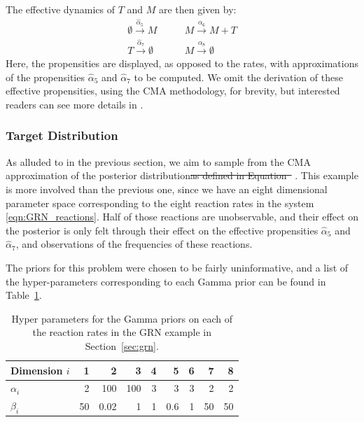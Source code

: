 \documentclass[final]{siamltex}
\providecommand{\DIFdel}[1]{{\protect\color{red}\sout{#1}}}                      %
\providecommand{\DIFdelbegin}{} %
\providecommand{\DIFdelend}{} %
\providecommand{\DIFaddbeginFL}{} %
\providecommand{\DIFaddendFL}{} %
\providecommand{\DIFdelbeginFL}{} %
\providecommand{\DIFdelendFL}{} %
\newcommand{\DIFscaledelfig}{0.5}
\newlength{\DIFdelgraphicswidth} %
\newlength{\DIFdelgraphicsheight} %
\newcommand{\DIFaddincludegraphics}[2][]{{\color{blue}\fbox{\DIFOincludegraphics[#1]{#2}}}} %
\newcommand{\DIFdelincludegraphics}[2][]{%
\sbox{\DIFdelgraphicsbox}{\DIFOincludegraphics[#1]{#2}}%
\settoboxwidth{\DIFdelgraphicswidth}{\DIFdelgraphicsbox} %
\settoboxtotalheight{\DIFdelgraphicsheight}{\DIFdelgraphicsbox} %
\scalebox{\DIFscaledelfig}{%
\parbox[b]{\DIFdelgraphicswidth}{\usebox{\DIFdelgraphicsbox}\\[-\baselineskip] \rule{\DIFdelgraphicswidth}{0em}}\llap{\resizebox{\DIFdelgraphicswidth}{\DIFdelgraphicsheight}{%
\setlength{\unitlength}{\DIFdelgraphicswidth}%
\begin{picture}(1,1)%
\thicklines\linethickness{2pt} %
{\color[rgb]{1,0,0}\put(0,0){\framebox(1,1){}}}%
{\color[rgb]{1,0,0}\put(0,0){\line( 1,1){1}}}%
{\color[rgb]{1,0,0}\put(0,1){\line(1,-1){1}}}%
\end{picture}%
}\hspace*{3pt}}} %
} %
\DeclareRobustCommand{\DIFdelbegin}{\DIFOdelbegin \let\includegraphics\DIFdelincludegraphics} %
\DeclareRobustCommand{\DIFdelend}{\DIFOaddend \let\includegraphics\DIFOincludegraphics} %
\DeclareRobustCommand{\DIFaddbeginFL}{\DIFOaddbeginFL \let\includegraphics\DIFaddincludegraphics} %
\DeclareRobustCommand{\DIFaddendFL}{\DIFOaddendFL \let\includegraphics\DIFOincludegraphics} %
\DeclareRobustCommand{\DIFdelbeginFL}{\DIFOdelbeginFL \let\includegraphics\DIFdelincludegraphics} %
\DeclareRobustCommand{\DIFdelendFL}{\DIFOaddendFL \let\includegraphics\DIFOincludegraphics} %
\begin{document}
The effective dynamics of $T$ and $M$ are then given by:
\begin{align}
	\emptyset \xrightarrow{\hat{\alpha}_5} M \quad & \quad M\xrightarrow{\alpha_6} M+T  \label{eqn:GRN_eff} \\
	T \xrightarrow{\hat{\alpha}_7} \emptyset \quad & \quad M \xrightarrow{\alpha_8} \emptyset \nonumber
\end{align}
Here, the propensities are displayed, as opposed to the rates, with
approximations of the propensities $\hat{\alpha}_5$ and
$\hat{\alpha}_7$ to be computed. We omit the derivation of these
effective propensities, using the CMA methodology, for brevity, but
interested readers can see more details in \cite{russ2017parallel}.

\subsubsection{Target Distribution}
As alluded to in the previous section, we aim to sample from the CMA
approximation of the posterior distribution\DIFdelbegin \DIFdel{as defined in
Equation~}%
\DIFdelend . This example is more involved
than the previous one, since we have an eight dimensional parameter
space corresponding to the eight reaction rates in the system
\eqref{eqn:GRN_reactions}. Half of those reactions are
unobservable, and their effect on the posterior is only felt through
their effect on the effective propensities $\hat{\alpha}_5$ and
$\hat{\alpha}_7$, and observations of the frequencies of these reactions.

The priors for this problem were chosen to be fairly uninformative,
and a list of the hyper-parameters corresponding to each Gamma prior can be found in Table~\ref{tab:grn_priors}.

\begin{table}[!h]
\centering
\DIFdelbeginFL %
\DIFdelendFL %
\DIFaddbeginFL \begin{tabular}{lrrrrrrrr}
	\DIFaddendFL \hline
	Dimension $i$ & 1 & 2& 3& 4 & 5 & 6 & 7 & 8 \\ \hline
	$\alpha_i$ & 2 & 100 & 100 & 3 & 3 & 3 & 2 & 2\\ \hline
	$\beta_i$ &50 & 0.02 & 1 & 1 & 0.6 & 1 & 50 & 50 \\ \hline
\end{tabular}
\caption{Hyper parameters for the Gamma priors on each of the reaction rates in the GRN example in Section~\ref{sec:grn}.}
\label{tab:grn_priors}
\end{table}
\end{document}
